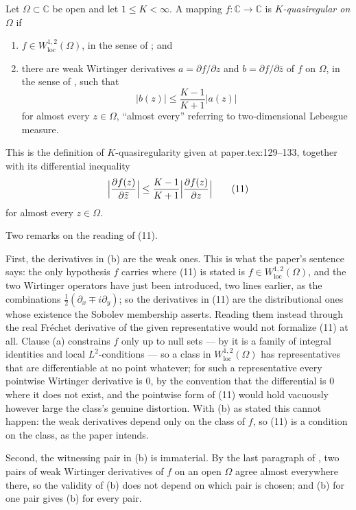 \begin{definition}
Let $\Omega\subset\mathbb{C}$ be open and let $1\le K<\infty$.  A mapping
$f\colon\mathbb{C}\to\mathbb{C}$ is \emph{$K$-quasiregular on $\Omega$} if
\begin{enumerate}
\item[(a)] $f\in W^{1,2}_{\mathrm{loc}}(\Omega)$, in the sense of
; and
\item[(b)] there are weak Wirtinger derivatives $a=\partial f/\partial z$ and
$b=\partial f/\partial\bar z$ of $f$ on $\Omega$, in the sense of
, such that
\[
  \bigl|b(z)\bigr|\le\frac{K-1}{K+1}\bigl|a(z)\bigr|
\]
for almost every $z\in\Omega$, ``almost every'' referring to two-dimensional
Lebesgue measure.
\end{enumerate}

This is the definition of $K$-quasiregularity given at paper.tex:129--133,
together with its differential inequality
\[
  \Bigl|\frac{\partial f(z)}{\partial\bar z}\Bigr|
  \le\frac{K-1}{K+1}\Bigl|\frac{\partial f(z)}{\partial z}\Bigr|
  \tag{11}
\]
for almost every $z\in\Omega$.

Two remarks on the reading of (11).

First, the derivatives in (b) are the weak ones.  This is what the paper's
sentence says: the only hypothesis $f$ carries where (11) is stated is
$f\in W^{1,2}_{\mathrm{loc}}(\Omega)$, and the two Wirtinger operators have
just been introduced, two lines earlier, as the combinations
$\frac12(\partial_x\mp i\partial_y)$; so the derivatives in (11) are the
distributional ones whose existence the Sobolev membership asserts.  Reading
them instead through the real Fr\'echet derivative of the given representative
would not formalize (11) at all.  Clause (a) constrains $f$ only up to null
sets --- by  it is a family of integral identities and
local $L^2$-conditions --- so a class in $W^{1,2}_{\mathrm{loc}}(\Omega)$ has
representatives that are differentiable at no point whatever; for such a
representative every pointwise Wirtinger derivative is $0$, by the convention
that the differential is $0$ where it does not exist, and the pointwise form
of (11) would hold vacuously however large the class's genuine distortion.
With (b) as stated this cannot happen: the weak derivatives depend only on the
class of $f$, so (11) is a condition on the class, as the paper intends.

Second, the witnessing pair in (b) is immaterial.  By the last paragraph of
, two pairs of weak Wirtinger derivatives of $f$ on
an open $\Omega$ agree almost everywhere there, so the validity of (b) does not
depend on which pair is chosen; and (b) for one pair gives (b) for every pair.
\end{definition}
